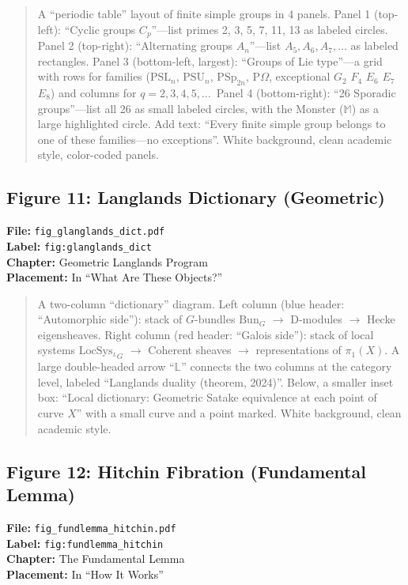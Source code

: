 \begin{quote}
A ``periodic table'' layout of finite simple groups in 4 panels. Panel 1 (top-left): ``Cyclic groups $C_p$''---list primes 2, 3, 5, 7, 11, 13 as labeled circles. Panel 2 (top-right): ``Alternating groups $A_n$''---list $A_5, A_6, A_7, \ldots$ as labeled rectangles. Panel 3 (bottom-left, largest): ``Groups of Lie type''---a grid with rows for families ($\text{PSL}_n$, $\text{PSU}_n$, $\text{PSp}_{2n}$, $\text{P}\Omega$, exceptional $G_2$ $F_4$ $E_6$ $E_7$ $E_8$) and columns for $q = 2, 3, 4, 5, \ldots$\ Panel 4 (bottom-right): ``26 Sporadic groups''---list all 26 as small labeled circles, with the Monster ($\mathbb{M}$) as a large highlighted circle. Add text: ``Every finite simple group belongs to one of these families---no exceptions''. White background, clean academic style, color-coded panels.
\end{quote}

\subsection*{Figure 11: Langlands Dictionary (Geometric)}
\textbf{File:} \texttt{fig\_glanglands\_dict.pdf} \\
\textbf{Label:} \texttt{fig:glanglands\_dict} \\
\textbf{Chapter:} Geometric Langlands Program \\
\textbf{Placement:} In ``What Are These Objects?''

\begin{quote}
A two-column ``dictionary'' diagram. Left column (blue header: ``Automorphic side''): stack of $G$-bundles $\mathrm{Bun}_G$ $\to$ D-modules $\to$ Hecke eigensheaves. Right column (red header: ``Galois side''): stack of local systems $\mathrm{LocSys}_{^LG}$ $\to$ Coherent sheaves $\to$ representations of $\pi_1(X)$. A large double-headed arrow ``$\mathbb{L}$'' connects the two columns at the category level, labeled ``Langlands duality (theorem, 2024)''. Below, a smaller inset box: ``Local dictionary: Geometric Satake equivalence at each point of curve $X$'' with a small curve and a point marked. White background, clean academic style.
\end{quote}

\subsection*{Figure 12: Hitchin Fibration (Fundamental Lemma)}
\textbf{File:} \texttt{fig\_fundlemma\_hitchin.pdf} \\
\textbf{Label:} \texttt{fig:fundlemma\_hitchin} \\
\textbf{Chapter:} The Fundamental Lemma \\
\textbf{Placement:} In ``How It Works''

